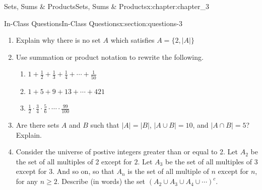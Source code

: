 \documentclass[oneside,10pt,]{book}
\numberwithin{equation}{section}
\newcommand{\card}[1]{\left| #1 \right|}
\begin{document}
\begin{chapterptx}{Sets, Sums \& Products}{}{Sets, Sums \& Products}{}{}{x:chapter:chapter_3}
\begin{sectionptx}{In-Class Questions}{}{In-Class Questions}{}{}{x:section:questions-3}
\begin{enumerate}[label=\arabic*.]
\begin{enumerate}[label=(\alph*)]
\end{enumerate}
%
\item{}Explain why there is no set \(A\) which satisfies \(A = \{2, \card{A}\}\)%
\item{}Use summation or product notation to rewrite the following.%
\begin{enumerate}[label=(\alph*)]
\item{}\(1 + \frac{1}{2} + \frac{1}{3}+ \frac{1}{4}+ \cdots + \frac{1}{50}\)%
\item{}\(1 + 5 + 9 + 13 + \cdots + 421\)%
\item{}\(\frac{1}{2}\cdot \frac{3}{4}\cdot \frac{5}{6}\cdot \cdots 			 
\cdot\frac{99}{100}\)%
\end{enumerate}
%
\item{}Are there sets \(A\) and \(B\) such that \(|A| = |B|\), \(|A\cup B| = 10\), and \(|A\cap B| = 5\)?  Explain.%
\item{}Consider the universe of postive integers greater than or equal to 2. Let \(A_2\) be the set of all multiples of 2 except for \(2\). Let \(A_3\) be the set of all multiples of 3 except for 3. And so on, so that \(A_n\) is the set of all multiple of \(n\) except for \(n\), for any \(n \ge 2\). Describe (in words) the set \(\left(A_2 \cup A_3 \cup A_4 \cup \cdots \right)^c\).%
\end{enumerate}
%
\end{sectionptx}
\end{chapterptx}
%
%
\typeout{************************************************}
\typeout{************************************************}
%
\end{document}
